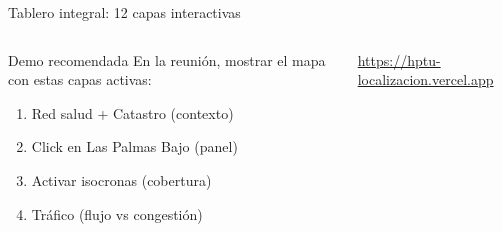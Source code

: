 \documentclass[aspectratio=169, 11pt]{beamer}
\begin{document}
\begin{frame}{Tablero integral: 12 capas interactivas}
\begin{columns}[T]
\vspace{4pt}
\begin{exampleblock}{\small Demo recomendada}
\footnotesize En la reunión, mostrar el mapa con estas capas activas:
\begin{enumerate}\scriptsize
  \item Red salud + Catastro (contexto)
  \item Click en Las Palmas Bajo (panel)
  \item Activar isocronas (cobertura)
  \item Tráfico (flujo vs congestión)
\end{enumerate}
\end{exampleblock}

\vspace{2pt}
{\scriptsize\textcolor{slate}{\url{https://hptu-localizacion.vercel.app}}}
\end{columns}
\end{frame}
\end{document}
